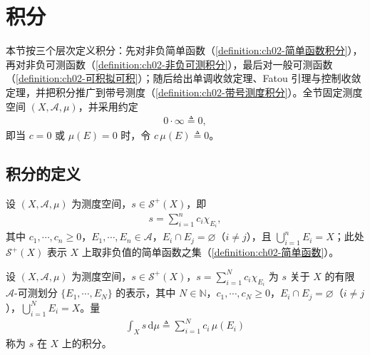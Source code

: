 \documentclass[../../main.tex]{subfiles}%
\begin{document}
\section{积分}\label{section:ch02-积分}

本节按三个层次定义积分：先对非负简单函数（\cref{definition:ch02-简单函数积分}），再对非负可测函数（\cref{definition:ch02-非负可测积分}），最后对一般可测函数（\cref{definition:ch02-可积拟可积}）；随后给出单调收敛定理、Fatou 引理与控制收敛定理，并把积分推广到带号测度（\cref{definition:ch02-带号测度积分}）。全节固定测度空间 $(X,\mathscr A,\mu)$，并采用约定
\begin{align*}
0\cdot\infty\triangleq0,
\end{align*}
即当 $c=0$ 或 $\mu(E)=0$ 时，令 $c\,\mu(E)\triangleq0$。

\subsection{积分的定义}\label{subsection:ch02-积分定义}

设 $(X,\mathscr A,\mu)$ 为测度空间，$s\in\mathscr S^+(X)$，即
\begin{align*}
s=\sum_{i=1}^nc_i\chi_{E_i},
\end{align*}
其中 $c_1,\cdots ,c_n\geqslant0$，$E_1,\cdots ,E_n\in\mathscr A$，$E_i\cap E_j=\varnothing$（$i\neq j$），且 $\bigcup_{i=1}^nE_i=X$；此处 $\mathscr S^+(X)$ 表示 $X$ 上取非负值的简单函数之集（\cref{definition:ch02-简单函数}）。

\begin{definition}\label{definition:ch02-简单函数积分}
设 $(X,\mathscr A,\mu)$ 为测度空间，$s\in\mathscr S^+(X)$，$s=\sum_{i=1}^Nc_i\chi_{E_i}$ 为 $s$ 关于 $X$ 的有限 $\mathscr A$-可测划分 $\{E_1,\cdots ,E_N\}$ 的表示，其中 $N\in\mathbb N$，$c_1,\cdots ,c_N\geqslant0$，$E_i\cap E_j=\varnothing$（$i\neq j$），$\bigcup_{i=1}^NE_i=X$。量
\begin{align*}
\int_Xs\,\mathrm{d}\mu\triangleq\sum_{i=1}^Nc_i\,\mu(E_i)
\end{align*}
称为 $s$ 在 $X$ 上的积分。
\end{definition}
\end{document}

